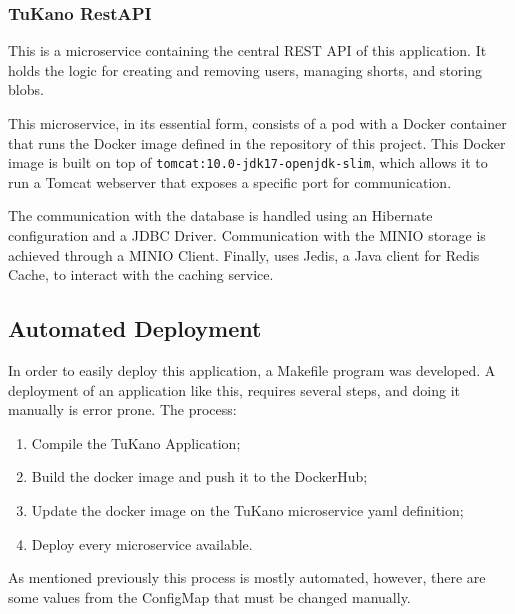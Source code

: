 \documentclass[10pt,a4paper,twocolumn]{article}
\begin{document}
\subsubsection{TuKano RestAPI}
This is a microservice containing the central REST API of this application. It holds the logic for creating and removing users, managing shorts, and storing blobs.
\par This microservice, in its essential form, consists of a pod with a Docker container that runs the Docker image defined in the repository of this project. This Docker image is built on top of \verb|tomcat:10.0-jdk17-openjdk-slim|, which allows it to run a Tomcat webserver that exposes a specific port for communication.
\par The communication with the database is handled using an Hibernate configuration and a JDBC Driver\cite{jdbc}. Communication with the MINIO storage is achieved through a MINIO Client\cite{minioClient}. Finally, uses Jedis\cite{jedis}, a Java client for Redis Cache, to interact with the caching service.


\subsection{Automated Deployment}
\label{sec:automatedDepl}
In order to easily deploy this application, a Makefile program was developed. A deployment of an application like this, requires several steps, and doing it manually is error prone.
The process:
\begin{enumerate}
  \itemsep0em 
  \item Compile the TuKano Application;
  \item Build the docker image and push it to the DockerHub;
  \item Update the docker image on the TuKano microservice yaml definition;
  \item Deploy every microservice available.
\end{enumerate}
As mentioned previously this process is mostly automated, however, there are some values from the ConfigMap that must be changed manually.
\end{document}
